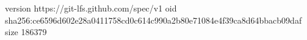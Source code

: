 version https://git-lfs.github.com/spec/v1
oid sha256:ce6596d602e28a0411758cd0c614c990a2b80e71084e4f39ca8d64bbacb09daf
size 186379
